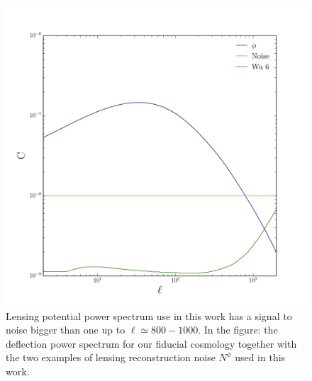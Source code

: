 \documentclass[aps,prd,preprint,groupedaddress]{revtex4-1}
\begin{document}
\begin{figure}[htbp]
\begin{center}
\includegraphics[scale=0.6]{PS_phi_with_noise.pdf}
\caption{Lensing potential power spectrum use in this work has a signal to noise bigger than one up to $\ell\simeq800-1000$.
In the figure: the deflection power spectrum for our fiducial cosmology together with the two examples of lensing reconstruction noise $N^{\phi}$ used in this work.}
\label{fig:phi-cl-noise}
\end{center}
\end{figure}
\end{document}
